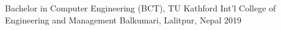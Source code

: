 
\begin{cventries}
  \cventry
    {Bachelor in Computer Engineering (BCT), TU} %
    {Kathford Int’l College of Engineering and Management} %
    {Balkumari, Lalitpur, Nepal} %
    {2019} %
    { } %
\end{cventries}
